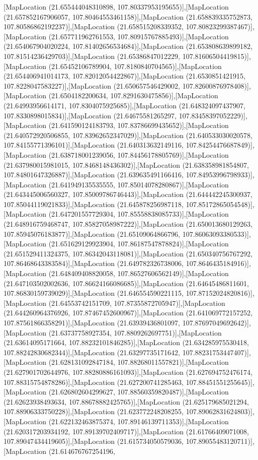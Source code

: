[MapLocation (21.655444048310898, 107.80337953195655)],[MapLocation (21.657852167906057, 107.80464553461158)],[MapLocation (21.658839335752873, 107.80586862192237)],[MapLocation (21.658515208339352, 107.80823299387467)],[MapLocation (21.657711962761553, 107.80915767885493)],[MapLocation (21.654067904020224, 107.81402656534684)],[MapLocation (21.653808639899182, 107.81514236429703)],[MapLocation (21.65386847012229, 107.81606504419815)],[MapLocation (21.65452106789904, 107.8180840704565)],[MapLocation (21.654406941014173, 107.82012054422867)],[MapLocation (21.6530851421915, 107.8228047583227)],[MapLocation (21.650657546429002, 107.82600876978408)],[MapLocation (21.6504182200634, 107.8291630475856)],[MapLocation (21.64993956614171, 107.8304075925685)],[MapLocation (21.648324097437907, 107.8330898015834)],[MapLocation (21.64675581265297, 107.83458397052229)],[MapLocation (21.641590124183793, 107.83786699435652)],[MapLocation (21.640572920506855, 107.83962652347029)],[MapLocation (21.640533030020578, 107.84155771396101)],[MapLocation (21.640313632149116, 107.84254476687849)],[MapLocation (21.638718001239056, 107.84456178805769)],[MapLocation (21.637980015981015, 107.8468148436302)],[MapLocation (21.638358981854807, 107.84801647326887)],[MapLocation (21.639635491166416, 107.84953996798933)],[MapLocation (21.641949135535555, 107.85014078280867)],[MapLocation (21.643445006560327, 107.85009786746443)],[MapLocation (21.644442245300937, 107.85044119021833)],[MapLocation (21.645878256987118, 107.85172865054548)],[MapLocation (21.647201557729304, 107.85558838085733)],[MapLocation (21.648916759468747, 107.85827058987222)],[MapLocation (21.650013680129263, 107.85945076183877)],[MapLocation (21.65109064866796, 107.86063093380533)],[MapLocation (21.651629129923904, 107.86187547878824)],[MapLocation (21.651529411324375, 107.86342043118081)],[MapLocation (21.650340756767292, 107.86468643383584)],[MapLocation (21.649782326738006, 107.8646435184916)],[MapLocation (21.648409408820058, 107.86527606562149)],[MapLocation (21.647103502002636, 107.86624166086685)],[MapLocation (21.64645486811601, 107.86830159739029)],[MapLocation (21.646554590221115, 107.87152024820816)],[MapLocation (21.64553742151709, 107.87355872705947)],[MapLocation (21.644260964376926, 107.87467452600967)],[MapLocation (21.641069772157252, 107.87561866358291)],[MapLocation (21.63939436801097, 107.87697049692642)],[MapLocation (21.63737758927354, 107.8809262697751)],[MapLocation (21.63614095171664, 107.88232101846285)],[MapLocation (21.634285975530418, 107.88242830682344)],[MapLocation (21.63297735171642, 107.88231753447407)],[MapLocation (21.628131092847184, 107.88268011557821)],[MapLocation (21.627901702644976, 107.88280886161093)],[MapLocation (21.627694752476174, 107.88315754878286)],[MapLocation (21.627200741285463, 107.88451551255645)],[MapLocation (21.626802604299627, 107.88560359820487)],[MapLocation (21.62623938493634, 107.88678882425765)],[MapLocation (21.625179685021294, 107.88906333750228)],[MapLocation (21.623772248208255, 107.89062831624803)],[MapLocation (21.622132463875374, 107.89146139711353)],[MapLocation (21.620317203934192, 107.89139702409717)],[MapLocation (21.61766409071008, 107.89047434419605)],[MapLocation (21.615734050579036, 107.89055483120711)],[MapLocation (21.614676767254196, 